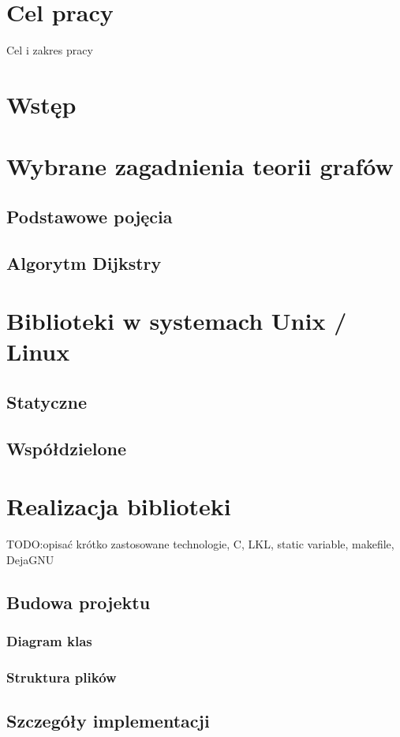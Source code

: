\documentclass[a4paper,12pt]{thesis}
\begin{document}
\stronaTytulowa

\tableofcontents

\chapter*{Cel pracy}
Cel i zakres pracy\cite{bib:test}
\chapter*{Wstęp}
\chapter{Wybrane zagadnienia teorii grafów}
\section{Podstawowe pojęcia}
\section{Algorytm Dijkstry}
\chapter{Biblioteki w systemach Unix / Linux}
\section{Statyczne}
\section{Współdzielone}
\chapter{Realizacja biblioteki}
TODO:opisać krótko zastosowane technologie, C, LKL, static variable, makefile, DejaGNU
\section{Budowa projektu}
\subsection{Diagram klas}
\subsection{Struktura plików}
\section{Szczegóły implementacji}
\end{document}
